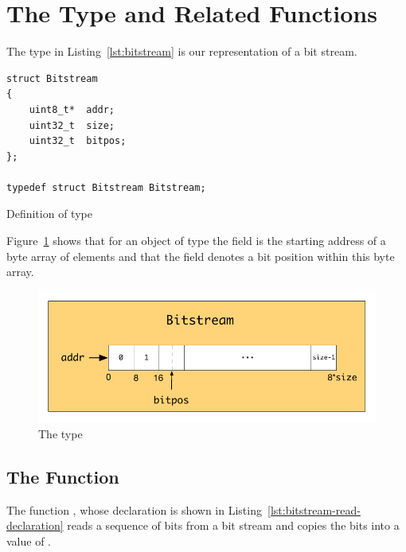 \section{The Type \bitstream and Related Functions}

The type \bitstream in Listing~\ref{lst:bitstream} is our \isoc representation of a bit stream.


\begin{listing}[hbt]
\begin{center}
\begin{lstlisting}[style=acsl-block]
struct Bitstream
{
    uint8_t*  addr;
    uint32_t  size;
    uint32_t  bitpos;
};

typedef struct Bitstream Bitstream;
\end{lstlisting}
\end{center}
\caption{\label{lst:bitstream} Definition of type \bitstream}
\end{listing}

Figure~\ref{fig:bit-stream-type}  shows that for an object of type \bitstream the field  is the
starting address of a byte array of  elements and that the field 
denotes a bit position within this byte array.

\begin{figure}[hbt]
\begin{center}
\includegraphics[scale=0.85]{Figures/bit-stream-type.pdf}
\caption{The type \bitstream}
\label{fig:bit-stream-type}
\end{center}
\end{figure}

\subsection{The Function \bitstreamread}

The function \bitstreamread, whose declaration is shown in Listing~\ref{lst:bitstream-read-declaration}
reads a sequence of bits from a bit stream and copies the bits into a value of .


